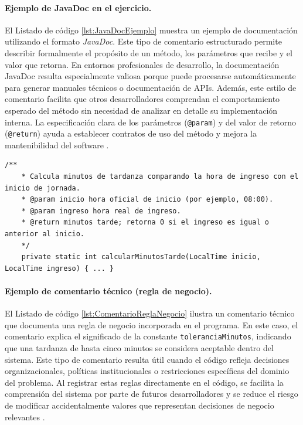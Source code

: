 \documentclass[12pt,twoside]{book}
\begin{document}
						\paragraph{Ejemplo de JavaDoc en el ejercicio.} El Listado de código \ref{lst:JavaDocEjemplo} muestra un ejemplo de documentación utilizando el formato \textit{JavaDoc}. Este tipo de comentario estructurado permite describir formalmente el propósito de un método, los parámetros que recibe y el valor que retorna. En entornos profesionales de desarrollo, la documentación JavaDoc resulta especialmente valiosa porque puede procesarse automáticamente para generar manuales técnicos o documentación de APIs. Además, este estilo de comentario facilita que otros desarrolladores comprendan el comportamiento esperado del método sin necesidad de analizar en detalle su implementación interna. La especificación clara de los parámetros (\texttt{@param}) y del valor de retorno (\texttt{@return}) ayuda a establecer contratos de uso del método y mejora la mantenibilidad del software \cite{Pressman2019Software,McConnell2004Code}.
						
						\begin{lstlisting}[style=Java,caption={Ejemplo de JavaDoc en el método de cálculo.}, label={lst:JavaDocEjemplo}]
	/**
	* Calcula minutos de tardanza comparando la hora de ingreso con el inicio de jornada.
	* @param inicio hora oficial de inicio (por ejemplo, 08:00).
	* @param ingreso hora real de ingreso.
	* @return minutos tarde; retorna 0 si el ingreso es igual o anterior al inicio.
	*/
	private static int calcularMinutosTarde(LocalTime inicio, LocalTime ingreso) { ... } \end{lstlisting}
						
						\paragraph{Ejemplo de comentario técnico (regla de negocio).} El Listado de código \ref{lst:ComentarioReglaNegocio} ilustra un comentario técnico que documenta una regla de negocio incorporada en el programa. En este caso, el comentario explica el significado de la constante \texttt{toleranciaMinutos}, indicando que una tardanza de hasta cinco minutos se considera aceptable dentro del sistema. Este tipo de comentario resulta útil cuando el código refleja decisiones organizacionales, políticas institucionales o restricciones específicas del dominio del problema. Al registrar estas reglas directamente en el código, se facilita la comprensión del sistema por parte de futuros desarrolladores y se reduce el riesgo de modificar accidentalmente valores que representan decisiones de negocio relevantes \cite{Pressman2019Software,McConnell2004Code}.
						
\end{document}
